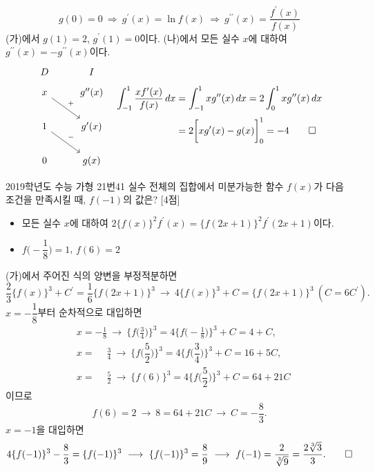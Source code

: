 \documentclass{article}
\begin{document}
\begin{sol}
	\[
		g(0)=0~\Longrightarrow~g^{\prime}(x)=\ln f(x)~\Longrightarrow~g^{\prime\prime}(x)=\dfrac{f^{\prime}(x)}{f(x)}
	\]
	(가)에서 $g(1)=2$, $g^\prime(1)=0$이다. (나)에서 모든 실수 $x$에 대하여 $g^{\prime\prime}(x)=-g^{\prime\prime}(x)$이다.
	\[
		\begin{tikzcd}
			D & I \\[-12pt]
			x \arrow[rd, "+"] & g^{\prime\prime}(x) \\
			1 \arrow[rd, "-"] & g^\prime(x) \\
			0 & g(x)
		\end{tikzcd}\quad\begin{aligned}
			\int_{-1}^1\dfrac{xf^{\prime}(x)}{f(x)}\,dx&=\int_{-1}^1xg^{\prime\prime}(x)\,dx=2\int_0^1xg^{\prime\prime}(x)\,dx\\[3pt]
			&=2\biggl[xg^{\prime}(x)-g(x)\biggr]_0^1=-4\qed
		\end{aligned}
	\]
\end{sol}

\newpage
\begin{prob}{2019학년도 수능 가형 21번}{41}
	실수 전체의 집합에서 미분가능한 함수 $f(x)$가 다음 조건을 만족시킬 때, $f(-1)$의 값은? [4점]
	\begin{hint}
		\begin{itemize}
			\item[(가)] 모든 실수 $x$에 대하여 $2\{f(x)\}^2f^{\prime}(x)=\{f(2x+1)\}^2f^{\prime}(2x+1)$이다.
			\item[(나)] $f\biggl(-\dfrac{1}{8}\biggr)=1$, $f(6)=2$
		\end{itemize}
	\end{hint}
\end{prob}

\begin{sol}
	(가)에서 주어진 식의 양변을 부정적분하면
	\[
		\frac{2}{3}\{f(x)\}^3+C^{\prime}=\frac{1}{6}\{f(2x+1)\}^3~\longrightarrow~4\{f(x)\}^3+C=\{f(2x+1)\}^3~(C=6C^{\prime}).
	\]
	$x=-\dfrac{1}{8}$부터 순차적으로 대입하면
	\[
		\begin{aligned}
			&x=-\frac{1}{8}~\longrightarrow~\biggl\{f\biggl(\frac{3}{4}\biggr)\biggr\}^3=4\biggl\{f\biggl(-\frac{1}{8}\biggr)\biggr\}^3+C=4+C,\\[3pt]
			&x=\phantom{-}\frac{3}{4}~\longrightarrow~\biggl\{f\biggl(\dfrac{5}{2}\biggr)\biggr\}^3=4\biggl\{f\biggl(\dfrac{3}{4}\biggr)\biggr\}^3+C=16+5C,\\[3pt]
			&x=\phantom{-}\frac{5}{2}~\longrightarrow~\{f(6)\}^3=4\biggl\{f\biggl(\dfrac{5}{2}\biggr)\biggr\}^3+C=64+21C
		\end{aligned}
	\]
	이므로
	\[
		f(6)=2~\longrightarrow~8=64+21C~\longrightarrow~C=-\frac{8}{3}.
	\]
	$x=-1$을 대입하면
	\[
		4\{f(-1)\}^3-\frac{8}{3}=\{f(-1)\}^3~\longrightarrow~\{f(-1)\}^3=\frac{8}{9}~\longrightarrow~f(-1)=\frac{2}{\sqrt[3]{9}}=\frac{2\sqrt[3]{3}}{3}.\qed
	\]
\end{sol}
\end{document}
